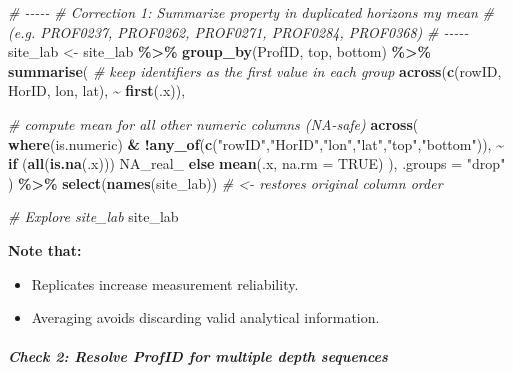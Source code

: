 \documentclass[
  10pt,
  b5paper,
  oneside]{book}
\newenvironment{Shaded}{\begin{snugshade}}{\end{snugshade}}
\newcommand{\AttributeTok}[1]{\textcolor[rgb]{0.13,0.29,0.53}{#1}}
\newcommand{\CommentTok}[1]{\textcolor[rgb]{0.56,0.35,0.01}{\textit{#1}}}
\newcommand{\ConstantTok}[1]{\textcolor[rgb]{0.56,0.35,0.01}{#1}}
\newcommand{\ControlFlowTok}[1]{\textcolor[rgb]{0.13,0.29,0.53}{\textbf{#1}}}
\newcommand{\FunctionTok}[1]{\textcolor[rgb]{0.13,0.29,0.53}{\textbf{#1}}}
\newcommand{\NormalTok}[1]{#1}
\newcommand{\OtherTok}[1]{\textcolor[rgb]{0.56,0.35,0.01}{#1}}
\newcommand{\SpecialCharTok}[1]{\textcolor[rgb]{0.81,0.36,0.00}{\textbf{#1}}}
\newcommand{\StringTok}[1]{\textcolor[rgb]{0.31,0.60,0.02}{#1}}
\begin{document}
\begin{Shaded}
\begin{Highlighting}[]
\CommentTok{\# {-}{-}{-}{-}{-}}
\CommentTok{\# Correction 1: Summarize property in duplicated horizons my mean}
\CommentTok{\# (e.g. PROF0237, PROF0262, PROF0271, PROF0284, PROF0368)}
\CommentTok{\# {-}{-}{-}{-}{-}}
\NormalTok{site\_lab }\OtherTok{\textless{}{-}}\NormalTok{ site\_lab }\SpecialCharTok{\%\textgreater{}\%}
  \FunctionTok{group\_by}\NormalTok{(ProfID, top, bottom) }\SpecialCharTok{\%\textgreater{}\%}
  \FunctionTok{summarise}\NormalTok{(}
    \CommentTok{\# keep identifiers as the first value in each group}
    \FunctionTok{across}\NormalTok{(}\FunctionTok{c}\NormalTok{(rowID, HorID, lon, lat), }\SpecialCharTok{\textasciitilde{}} \FunctionTok{first}\NormalTok{(.x)),}
    
    \CommentTok{\# compute mean for all other numeric columns (NA{-}safe)}
    \FunctionTok{across}\NormalTok{(}
      \FunctionTok{where}\NormalTok{(is.numeric) }\SpecialCharTok{\&} \SpecialCharTok{!}\FunctionTok{any\_of}\NormalTok{(}\FunctionTok{c}\NormalTok{(}\StringTok{"rowID"}\NormalTok{,}\StringTok{"HorID"}\NormalTok{,}\StringTok{"lon"}\NormalTok{,}\StringTok{"lat"}\NormalTok{,}\StringTok{"top"}\NormalTok{,}\StringTok{"bottom"}\NormalTok{)),}
      \SpecialCharTok{\textasciitilde{}} \ControlFlowTok{if}\NormalTok{ (}\FunctionTok{all}\NormalTok{(}\FunctionTok{is.na}\NormalTok{(.x))) }\ConstantTok{NA\_real\_} \ControlFlowTok{else} \FunctionTok{mean}\NormalTok{(.x, }\AttributeTok{na.rm =} \ConstantTok{TRUE}\NormalTok{)}
\NormalTok{    ),}
    \AttributeTok{.groups =} \StringTok{"drop"}
\NormalTok{  ) }\SpecialCharTok{\%\textgreater{}\%}
  \FunctionTok{select}\NormalTok{(}\FunctionTok{names}\NormalTok{(site\_lab))   }\CommentTok{\# \textless{}{-} restores original column order}

\CommentTok{\# Explore site\_lab}
\NormalTok{site\_lab}
\end{Highlighting}
\end{Shaded}

\textbf{Note that:}

\begin{itemize}
\item
  Replicates increase measurement reliability.
\item
  Averaging avoids discarding valid analytical information.
\end{itemize}

\subparagraph*{Check 2: Resolve ProfID for multiple depth sequences}\label{check-2-resolve-profid-for-multiple-depth-sequences}
\end{document}
